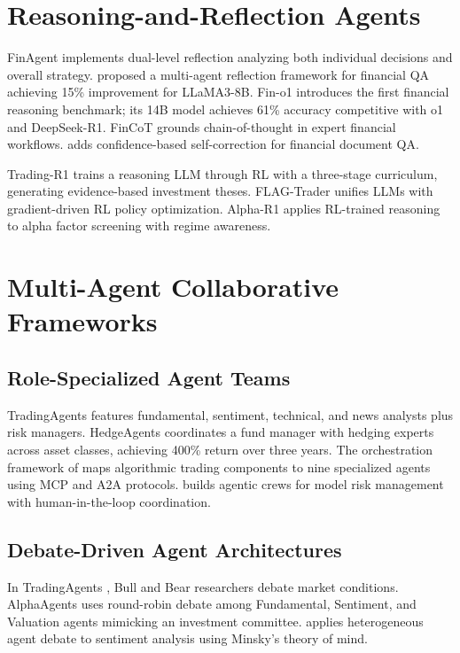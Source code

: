 \documentclass[12pt]{report}
\begin{document}
\section{Reasoning-and-Reflection Agents}

FinAgent \citep{zhang2024finagent} implements dual-level reflection analyzing both individual decisions and overall strategy. \citet{fatemi2024reflection} proposed a multi-agent reflection framework for financial QA achieving 15\% improvement for LLaMA3-8B. Fin-o1 \citep{qian2025fino1} introduces the first financial reasoning benchmark; its 14B model achieves 61\% accuracy competitive with o1 and DeepSeek-R1. FinCoT \citep{fincot2025} grounds chain-of-thought in expert financial workflows. \citet{improvedllmagent2025} adds confidence-based self-correction for financial document QA.

Trading-R1 \citep{xiao2025tradingr1} trains a reasoning LLM through RL with a three-stage curriculum, generating evidence-based investment theses. FLAG-Trader \citep{xiong2025flagtrader} unifies LLMs with gradient-driven RL policy optimization. Alpha-R1 \citep{jiang2025alphar1} applies RL-trained reasoning to alpha factor screening with regime awareness.

\section{Multi-Agent Collaborative Frameworks}

\subsection{Role-Specialized Agent Teams}

TradingAgents \citep{xiao2024tradingagents} features fundamental, sentiment, technical, and news analysts plus risk managers. HedgeAgents \citep{li2025hedgeagents} coordinates a fund manager with hedging experts across asset classes, achieving 400\% return over three years. The orchestration framework of \citet{li2025orchestration} maps algorithmic trading components to nine specialized agents using MCP and A2A protocols. \citet{okpala2025agenticfinancial} builds agentic crews for model risk management with human-in-the-loop coordination.

\subsection{Debate-Driven Agent Architectures}

In TradingAgents \citep{xiao2024tradingagents}, Bull and Bear researchers debate market conditions. AlphaAgents \citep{zhao2025alphaagents} uses round-robin debate among Fundamental, Sentiment, and Valuation agents mimicking an investment committee. \citet{xing2025heterogeneous} applies heterogeneous agent debate to sentiment analysis using Minsky's theory of mind.
\end{document}
